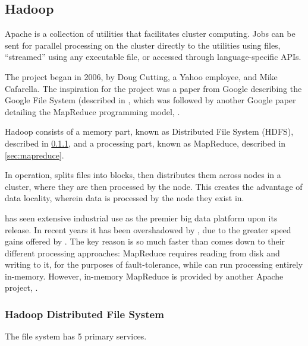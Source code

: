 \subsection{Hadoop}\label{sec:hadoop-1}

Apache  is a collection of utilities that facilitates cluster
computing. Jobs can be sent for parallel processing on the cluster
directly to the utilities using  files, ``streamed'' using any
executable file, or accessed through language-specific APIs.

The project began in 2006, by Doug Cutting, a Yahoo employee, and Mike
Cafarella. The inspiration for the project was a paper from Google
describing the Google File System (described in
\textcite{ghemawat2003google}, which was followed by another Google paper
detailing the MapReduce programming model, \textcite{dean2004mapreduce}.

Hadoop consists of a memory part, known as  Distributed File
System (HDFS), described in \cref{sec:hdfs},
and a processing part, known as MapReduce, described in
\cref{sec:mapreduce}.

In operation,  splits files into blocks, then distributes them
across nodes in a cluster, where they are then processed by the node.
This creates the advantage of data locality, wherein data is processed
by the node they exist in.

 has seen extensive industrial use as the premier big data
platform upon its release. In recent years it has been overshadowed by
, due to the greater speed gains offered by . The key reason
 is so much faster than  comes down to their different
processing approaches:  MapReduce requires reading from disk and
writing to it, for the purposes of fault-tolerance, while  can run
processing entirely in-memory. However, in-memory MapReduce is provided
by another Apache project, \cite{zheludkov2017high}.

\subsubsection{Hadoop Distributed File System}\label{sec:hdfs}

The file system has 5 primary services.

